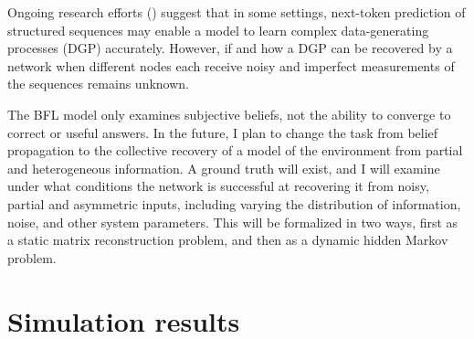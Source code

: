 \documentclass[]{article}
\begin{document}
Ongoing research efforts (\cite{malachAutoRegressiveNextTokenPredictors2023}) suggest that in some settings, next-token prediction of structured sequences may enable a model to learn complex data-generating processes (DGP) accurately. However, if and how a DGP can be recovered by a network when different nodes each receive noisy and imperfect measurements of the sequences remains unknown.

The BFL model only examines subjective beliefs, not the ability to converge to correct or useful answers. In the future, I plan to change the task from belief propagation to the collective recovery of a model of the environment from partial and heterogeneous information. A ground truth will exist, and I will examine under what conditions the network is successful at recovering it from noisy, partial and asymmetric inputs, including varying the distribution of information, noise, and other system parameters. This will be formalized in two ways, first as a static matrix reconstruction problem, and then as a dynamic hidden Markov problem.


\printbibliography[heading=bibintoc, title={References}]

\newpage

\appendix

\section{Simulation results}
\end{document}
